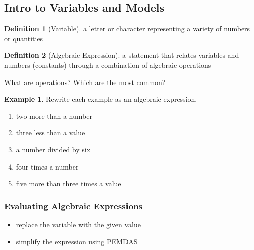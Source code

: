 \documentclass[addpoints,12pt]{exam}
\theoremstyle{definition}
\newtheorem{example}{Example}[subsection]
\newtheorem{definition}{Definition}[subsection]
\begin{document}
\setcounter{section}{1}
\setcounter{subsection}{0}

\subsection{Intro to Variables and Models}

\begin{definition}[Variable]
a letter or character representing a variety of numbers or quantities
\end{definition}

\begin{definition}[Algebraic Expression]
a statement that relates variables and numbers (constants) through a combination of algebraic operations
\end{definition}

\vspace{.5in}
\noindent What are operations? Which are the most common?

\vspace{.75in}

\begin{example}
Rewrite each example as an algebraic expression.
\begin{enumerate}
\item two more than a number
\vspace{.5in}
\item three less than a value
\vspace{.5in}
\item a number divided by six
\vspace{.5in}
\item four times a number
\vspace{.5in}
\item five more than three times a value
\end{enumerate}
\vspace{.5in}
\end{example}

\newpage

\subsubsection*{Evaluating Algebraic Expressions}
\begin{itemize}
\item replace the variable with the given value
\item simplify the expression using PEMDAS
\end{itemize}
\end{document}
